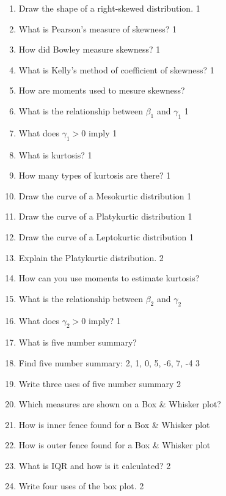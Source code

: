 \documentclass[a4paper,oneside]{book}
\begin{document}
\begin{enumerate}
    \item Draw the shape of a right-skewed distribution.  \hfill 1
    \item What is Pearson's measure of skewness? \hfill 1
    \item How did Bowley measure skewness? \hfill 1
    \item What is Kelly's method of coefficient of skewness? \hfill 1
    \item How are moments used to mesure skewness?
    \item What is the relationship between $\beta_1$ and $\gamma_1$ \hfill 1
    \item What does $\gamma_1>0$ imply \hfill 1
    \item What is kurtosis? \hfill 1
    \item How many types of kurtosis are there? \hfill 1
    \item Draw the curve of a Mesokurtic distribution \hfill 1
    \item Draw the curve of a Platykurtic distribution \hfill 1
    \item Draw the curve of a Leptokurtic distribution \hfill 1
    \item Explain the Platykurtic distribution. \hfill 2
    \item How can you use moments to estimate kurtosis?
    \item What is the relationship between $\beta_2$ and $\gamma_2$
    \item What does $\gamma_2>0$ imply? \hfill 1
    \item What is five number summary?
    \item Find five number summary: 2, 1, 0, 5, -6, 7, -4 \hfill 3
    \item Write three uses of five number summary \hfill 2
    \item Which measures are shown on a Box \& Whisker plot?
    \item How is inner fence found for a Box \& Whisker plot
    \item How is outer fence found for a Box \& Whisker plot
    \item What is IQR and how is it calculated? \hfill 2
    \item Write four uses of the box plot. \hfill 2
    \end{enumerate}
\end{document}
